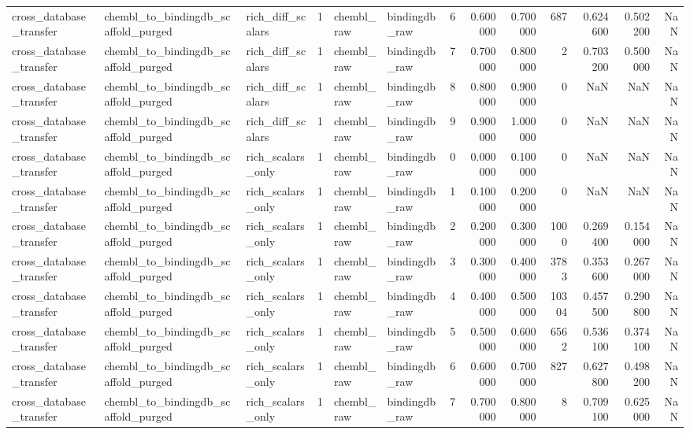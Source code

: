 \begin{longtable}{lllrllrrrrrrr}
cross\_database\_transfer & chembl\_to\_bindingdb\_scaffold\_purged & rich\_diff\_scalars & 1 & chembl\_raw & bindingdb\_raw & 6 & 0.600000 & 0.700000 & 687 & 0.624600 & 0.502200 & NaN \\
cross\_database\_transfer & chembl\_to\_bindingdb\_scaffold\_purged & rich\_diff\_scalars & 1 & chembl\_raw & bindingdb\_raw & 7 & 0.700000 & 0.800000 & 2 & 0.703200 & 0.500000 & NaN \\
cross\_database\_transfer & chembl\_to\_bindingdb\_scaffold\_purged & rich\_diff\_scalars & 1 & chembl\_raw & bindingdb\_raw & 8 & 0.800000 & 0.900000 & 0 & NaN & NaN & NaN \\
cross\_database\_transfer & chembl\_to\_bindingdb\_scaffold\_purged & rich\_diff\_scalars & 1 & chembl\_raw & bindingdb\_raw & 9 & 0.900000 & 1.000000 & 0 & NaN & NaN & NaN \\
cross\_database\_transfer & chembl\_to\_bindingdb\_scaffold\_purged & rich\_scalars\_only & 1 & chembl\_raw & bindingdb\_raw & 0 & 0.000000 & 0.100000 & 0 & NaN & NaN & NaN \\
cross\_database\_transfer & chembl\_to\_bindingdb\_scaffold\_purged & rich\_scalars\_only & 1 & chembl\_raw & bindingdb\_raw & 1 & 0.100000 & 0.200000 & 0 & NaN & NaN & NaN \\
cross\_database\_transfer & chembl\_to\_bindingdb\_scaffold\_purged & rich\_scalars\_only & 1 & chembl\_raw & bindingdb\_raw & 2 & 0.200000 & 0.300000 & 1000 & 0.269400 & 0.154000 & NaN \\
cross\_database\_transfer & chembl\_to\_bindingdb\_scaffold\_purged & rich\_scalars\_only & 1 & chembl\_raw & bindingdb\_raw & 3 & 0.300000 & 0.400000 & 3783 & 0.353600 & 0.267000 & NaN \\
cross\_database\_transfer & chembl\_to\_bindingdb\_scaffold\_purged & rich\_scalars\_only & 1 & chembl\_raw & bindingdb\_raw & 4 & 0.400000 & 0.500000 & 10304 & 0.457500 & 0.290800 & NaN \\
cross\_database\_transfer & chembl\_to\_bindingdb\_scaffold\_purged & rich\_scalars\_only & 1 & chembl\_raw & bindingdb\_raw & 5 & 0.500000 & 0.600000 & 6562 & 0.536100 & 0.374100 & NaN \\
cross\_database\_transfer & chembl\_to\_bindingdb\_scaffold\_purged & rich\_scalars\_only & 1 & chembl\_raw & bindingdb\_raw & 6 & 0.600000 & 0.700000 & 827 & 0.627800 & 0.498200 & NaN \\
cross\_database\_transfer & chembl\_to\_bindingdb\_scaffold\_purged & rich\_scalars\_only & 1 & chembl\_raw & bindingdb\_raw & 7 & 0.700000 & 0.800000 & 8 & 0.709100 & 0.625000 & NaN \\

\end{longtable}
